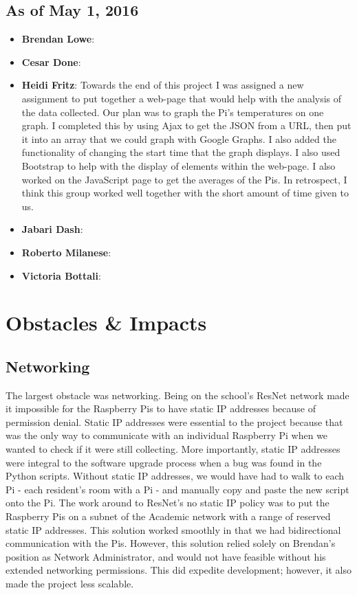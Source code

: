 \documentclass{article}
\begin{document}
			\subsection{As of May 1, 2016}
				\begin{itemize}
					\item {\bfseries Brendan Lowe}:
					\item {\bfseries Cesar Done}:
					\item {\bfseries Heidi Fritz}: Towards the end of this project I was assigned a new assignment to put together a web-page that would help   												   with the 
									   analysis of the data collected.  Our plan was to graph the Pi's temperatures on one graph.  I completed this by using 
									   Ajax to get the JSON from a URL, then put it into an array that we could graph with Google Graphs.  I also added the 
									   functionality of changing the start time that the graph displays.  I also used Bootstrap to help with the display of 
									   elements within the web-page.  I also worked on the JavaScript page to get the averages of the Pis.  In retrospect, I 
									   think this group worked well together with the short amount of time given to us.  
					\item {\bfseries Jabari Dash}:
					\item {\bfseries Roberto Milanese}:
					\item {\bfseries Victoria Bottali}:			
				\end{itemize}
			
	\newpage
	\section{Obstacles \& Impacts}\label{sec:obstacles}	
		\subsection{Networking}						
			The largest obstacle was networking. Being on the school's ResNet network made it impossible for the Raspberry Pis to have static IP addresses 
			because of permission denial. Static IP addresses were essential to the project because that was the only way to communicate with an individual 
			Raspberry Pi when we wanted to check if it were still collecting. More importantly, static IP addresses were integral to the software upgrade 
			process when a bug was found in the Python scripts. Without static IP addresses, we would have had to walk to each Pi - each resident's room with 
			a Pi - and manually copy and paste the new script onto the Pi. The work around to ResNet's no static IP policy was to put the Raspberry Pis on a 	
			subnet of the Academic network with a range of reserved static IP addresses. This solution worked smoothly in that we had bidirectional 
			communication with the Pis. However, this solution relied solely on Brendan's position as Network Administrator, and would not have feasible 
			without his extended networking permissions. This did expedite development; however, it also made the project less scalable.
			
\end{document}

